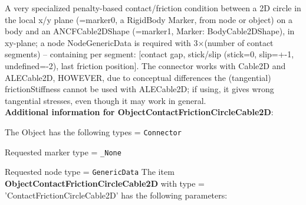 %
\newpage

\label{sec:item:ObjectContactFrictionCircleCable2D}
A very specialized penalty-based contact/friction condition between a 2D circle in the local x/y plane (=marker0, a RigidBody Marker, from node or object) on a body and an ANCFCable2DShape (=marker1, Marker: BodyCable2DShape), in xy-plane; a node NodeGenericData is required with 3$\times$(number of contact segments) -- containing per segment: [contact gap, stick/slip (stick=0, slip=+-1, undefined=-2), last friction position]. The connector works with Cable2D and ALECable2D, HOWEVER, due to conceptual differences the (tangential) frictionStiffness cannot be used with ALECable2D; if using, it gives wrong tangential stresses, even though it may work in general.\vspace{12pt}
 \\{\bf Additional information for ObjectContactFrictionCircleCable2D}:
\bi
  \item The Object has the following types = \texttt{Connector}
  \item Requested marker type = \texttt{\_None}
  \item Requested node type = \texttt{GenericData}
\ei
\vspace{12pt} \noindent The item {\bf ObjectContactFrictionCircleCable2D} with type = 'ContactFrictionCircleCable2D' has the following parameters:\vspace{-1cm}\\ 
